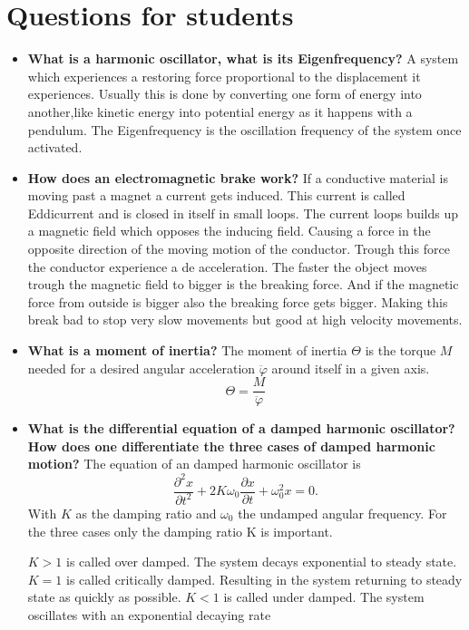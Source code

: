 \section{Questions for students}

\begin{itemize}
	\item \textbf{ What is a harmonic oscillator, what is its Eigenfrequency?}
	A system which experiences a restoring force proportional to the displacement it experiences.
	Usually this is done by converting one form of energy into another,like kinetic energy into potential energy as it happens with a pendulum.
	The Eigenfrequency is the oscillation frequency of the system once activated.
	
	\item \textbf{How does an electromagnetic brake work?}
	If a conductive material is moving past a magnet a current gets induced. This current is called Eddicurrent and is closed in itself in small loops. 
	The current loops builds up a magnetic field which opposes the inducing field.
	Causing a force in the opposite direction of the moving motion of the conductor.
	Trough this force the conductor experience a de acceleration. 
	The faster the object moves trough the magnetic field to bigger is the breaking force.
	And if the magnetic force from outside is bigger also the breaking force gets bigger.
	Making this break bad to stop very slow movements but good at high velocity movements.
	
	\item \textbf{What is a moment of inertia?}
	The moment of inertia $\Theta$ is the torque $M$ needed for a desired angular acceleration $\ddot{\varphi}$ around itself in a given axis. 
	\[
	\Theta = \frac{M}{\ddot{\varphi}}
	\]
	  
	
	
	
	\item\textbf{ What is the differential equation of a damped
	harmonic oscillator? How does one differentiate
	the three cases of damped harmonic motion?}
The equation of an damped harmonic oscillator is
\[
\frac{\partial^2x}{\partial t^2}+2K\omega_0\frac{\partial x}{\partial t} + \omega_0^2 x =0.
\] With $K$ as the damping ratio and $\omega_0$ the undamped angular frequency.
For the three cases only the damping ratio K is important.

$K>1$ is called over damped. The system decays exponential to steady state.
$K=1$ is called critically damped. Resulting in the system returning to steady state as quickly as possible.
$K<1$ is called under damped. The system oscillates with an exponential decaying rate 



\end{itemize}
